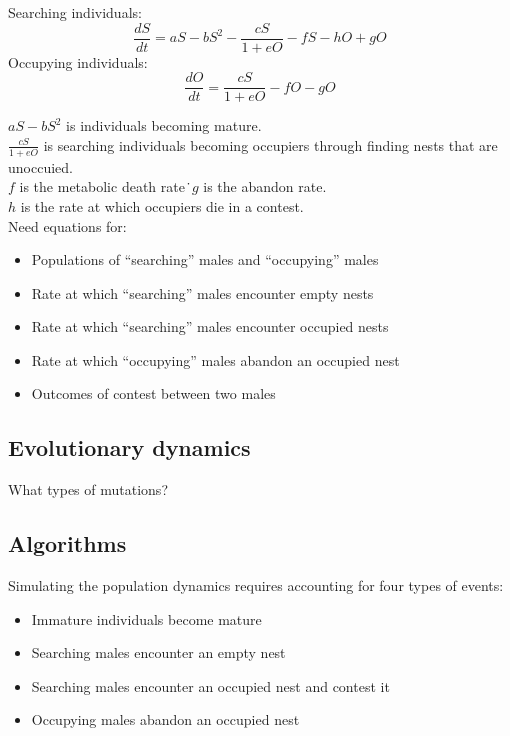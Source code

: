 \documentclass[a4paper,11pt]{article}
\begin{document}
Searching individuals:
\begin{equation} \label{eq:searching}
    \frac{dS}{dt} = aS - bS^2 - \frac{cS}{1+eO} - fS - hO + gO
\end{equation}
Occupying individuals:
\begin{equation} \label{eq:occupying}
    \frac{dO}{dt} = \frac{cS}{1+eO} - fO - gO
\end{equation}

$aS - bS^2$ is individuals becoming mature.\\
$\frac{cS}{1+eO}$ is searching individuals becoming occupiers through finding nests that are unoccuied.\\
$f$ is the metabolic death rate\.\
$g$ is the abandon rate.\\
$h$ is the rate at which occupiers die in a contest.\\

Need equations for:
\begin{itemize}
    \item Populations of ``searching'' males and  ``occupying'' males
    \item Rate at which ``searching'' males encounter empty nests
    \item Rate at which ``searching'' males encounter occupied nests
    \item Rate at which ``occupying'' males abandon an occupied nest
    \item Outcomes of contest between two males
\end{itemize}

\subsection{Evolutionary dynamics}

What types of mutations?

\subsection{Algorithms}
Simulating the population dynamics requires accounting for four types of events:
\begin{itemize}
    \item Immature individuals become mature
    \item Searching males encounter an empty nest
    \item Searching males encounter an occupied nest and contest it
    \item Occupying males abandon an occupied nest
\end{itemize}
\end{document}
